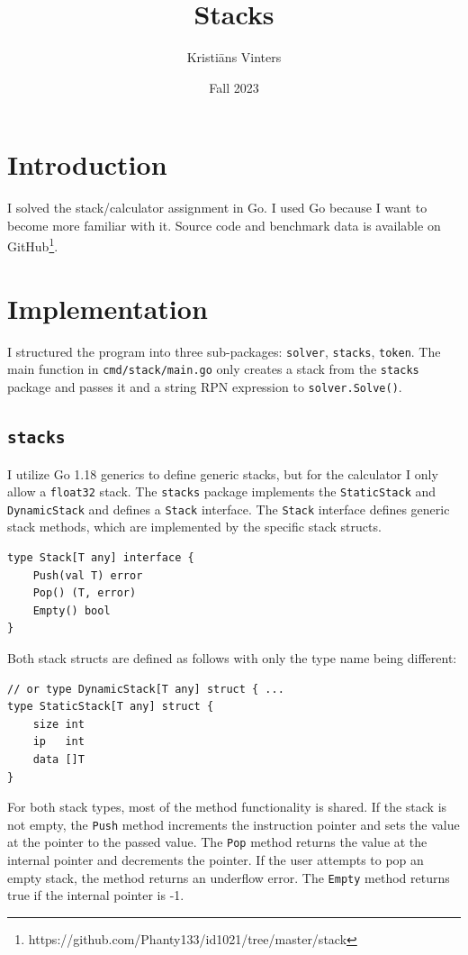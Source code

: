 \documentclass[a4paper,11pt]{article}
\title{\textbf{Stacks}}
\author{Kristiāns Vinters}
\date{Fall 2023}
\begin{document}
    \maketitle
    \section*{Introduction}

    I solved the stack/calculator assignment in Go. I used Go because I want to become more familiar with it. Source code and benchmark data is available on GitHub\footnote{https://github.com/Phanty133/id1021/tree/master/stack}.

    \section*{Implementation}

    I structured the program into three sub-packages: \texttt{solver}, \texttt{stacks}, \texttt{token}. The main function in \texttt{cmd/stack/main.go} only creates a stack from the \texttt{stacks} package and passes it and a string RPN expression to \texttt{solver.Solve()}.

    \subsection*{\texttt{stacks}}

    I utilize Go 1.18 generics to define generic stacks, but for the calculator I only allow a \texttt{float32} stack. The \texttt{stacks} package implements the \texttt{StaticStack} and \texttt{DynamicStack} and defines a \texttt{Stack} interface. The \texttt{Stack} interface defines generic stack methods, which are implemented by the specific stack structs.

    \begin{verbatim}
type Stack[T any] interface {
    Push(val T) error
    Pop() (T, error)
    Empty() bool
}
    \end{verbatim}

Both stack structs are defined as follows with only the type name being different:
    \begin{verbatim}
// or type DynamicStack[T any] struct { ...
type StaticStack[T any] struct {
    size int
    ip   int
    data []T
}
    \end{verbatim}

    For both stack types, most of the method functionality is shared. If the stack is not empty, the \texttt{Push} method increments the instruction pointer and sets the value at the pointer to the passed value. The \texttt{Pop} method returns the value at the internal pointer and decrements the pointer. If the user attempts to pop an empty stack, the method returns an underflow error. The \texttt{Empty} method returns true if the internal pointer is -1.
\end{document}
